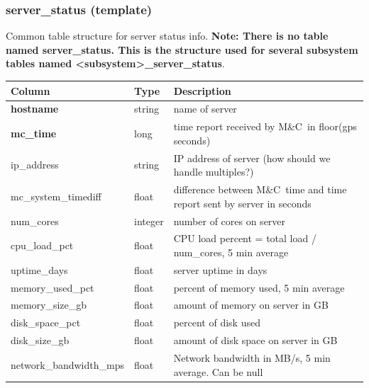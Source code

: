 \documentclass{article}
\newcommand{\mc}{M\&C}
\begin{document}
\subsubsection{server\_status (template)}
\label{sec:server_status}
Common table structure for server status info. \textbf{Note: There is no table named server\_status. This is the structure used for several subsystem tables named \textless subsystem\textgreater\_server\_status}.
\begin{center}
 \begin{tabular}{| p{4cm} | p{2cm} | p{10cm} |}
\hline
 {\bf Column} & {\bf Type}  & {\bf Description} \\ [0.5ex]  \hline\hline
 \textbf{hostname} & string &  name of server \\ \hline
 \textbf{mc\_time} & long & time report received by \mc\ in floor(gps seconds) \\ \hline
 ip\_address & string & IP address of server (how should we handle multiples?) \\\hline
mc\_system\_timediff & float & difference between \mc\ time and time report sent by server in seconds \\\hline
num\_cores & integer & number of cores on server \\\hline
cpu\_load\_pct & float & CPU load percent = total load / num\_cores, 5 min average  \\\hline
uptime\_days & float & server uptime in days  \\\hline
memory\_used\_pct & float & percent of memory used, 5 min average  \\\hline
memory\_size\_gb & float & amount of memory on server in GB \\\hline
disk\_space\_pct & float & percent of disk used  \\\hline
disk\_size\_gb & float & amount of disk space on server in GB \\\hline
network\_bandwidth\_mps & float & Network bandwidth in MB/s, 5 min average. Can be null \\\hline
\end{tabular}
\end{center}
\end{document}
